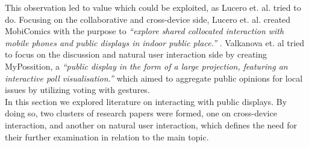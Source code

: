This observation led to value which could be exploited, as Lucero et. al. tried to do. 
Focusing on the collaborative and cross-device side, Lucero et. al. created MobiComics with the purpose to \emph{``explore shared collocated interaction with mobile phones and public displays in indoor public place.''} \cite{Lucero:2012}. 
Valkanova et. al tried to focus on the discussion and natural user interaction side by creating MyPossition, a \emph{``public display in the form of a large projection, featuring an interactive poll visualisation.''} \cite{Valkanova:2014} which aimed to aggregate public opinions for local issues by utilizing voting with gestures.\\

In this section we explored literature on interacting with public displays. 
By doing so, two clusters of research papers were formed, one on cross-device interaction, and another on natural user interaction, which defines the need for their further examination in relation to the main topic.

